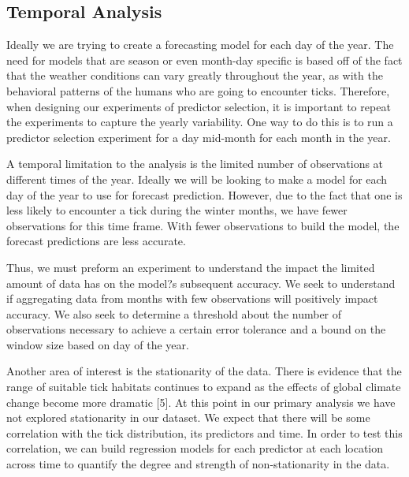 \subsection{Temporal Analysis}
Ideally we are trying to create a forecasting model for each day of the year. The need for models that are season or even month-day specific is based off of the fact that the weather conditions can vary greatly throughout the year, as with the behavioral patterns of the humans who are going to encounter ticks. Therefore, when designing our experiments of predictor selection, it is important to repeat the experiments to capture the yearly variability. One way to do this is to run a predictor selection experiment for a day mid-month for each month in the year. \newline

\noindent A temporal limitation to the analysis is the limited number of observations at different times of the year. Ideally we will be looking to make a model for each day of the year to use for forecast prediction. However, due to the fact that one is less likely to encounter a tick during the winter months, we have fewer observations for this time frame. With fewer observations to build the model, the forecast predictions are less accurate. \newline 

\noindent Thus, we must preform an experiment to understand the impact the limited amount of data has on the model?s subsequent accuracy. We seek to understand if aggregating data from months with few observations will positively impact accuracy. We also seek to determine a threshold about the number of observations necessary to achieve a certain error tolerance and a bound on the window size based on day of the year. \newline

\noindent Another area of interest is the stationarity of the data. There is evidence that the range of suitable tick habitats continues to expand as the effects of global climate change become more dramatic [5]. At this point in our primary analysis we have not explored stationarity in our dataset. We expect that there will be some correlation with the tick distribution, its predictors and time. In order to test this correlation, we can build regression models for each predictor at each location across time to quantify the degree and strength of non-stationarity in the data.  \newline


